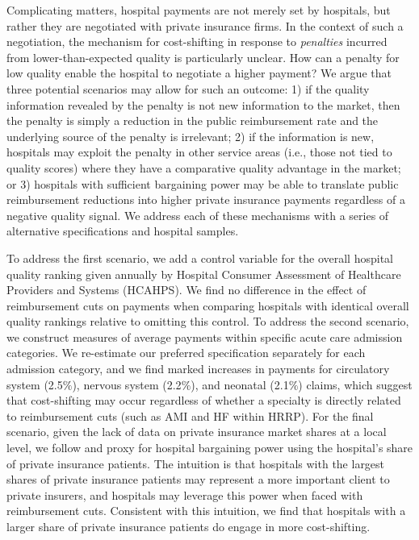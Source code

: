 \documentclass[12pt]{article}
\begin{document}
Complicating matters, hospital payments are not merely set by hospitals, but rather they are negotiated with private insurance firms. In the context of such a negotiation, the mechanism for cost-shifting in response to \textit{penalties} incurred from lower-than-expected quality is particularly unclear. How can a penalty for low quality enable the hospital to negotiate a higher payment? We argue that three potential scenarios may allow for such an outcome: 1) if the quality information revealed by the penalty is not new information to the market, then the penalty is simply a reduction in the public reimbursement rate and the underlying source of the penalty is irrelevant; 2) if the information is new, hospitals may exploit the penalty in other service areas (i.e., those not tied to quality scores) where they have a comparative quality advantage in the market; or 3) hospitals with sufficient bargaining power may be able to translate public reimbursement reductions into higher private insurance payments regardless of a negative quality signal. We address each of these mechanisms with a series of alternative specifications and hospital samples.

To address the first scenario, we add a control variable for the overall hospital quality ranking given annually by Hospital Consumer Assessment of Healthcare Providers and Systems (HCAHPS).  We find no difference in the effect of reimbursement cuts on payments when comparing hospitals with identical overall quality rankings relative to omitting this control.  To address the second scenario, we construct measures of average payments within specific acute care admission categories. We re-estimate our preferred specification separately for each admission category, and we find marked increases in payments for circulatory system (2.5$\%$), nervous system (2.2$\%$), and neonatal (2.1$\%$) claims, which suggest that cost-shifting may occur regardless of whether a specialty is directly related to reimbursement cuts (such as AMI and HF within HRRP).  For the final scenario, given the lack of data on private insurance market shares at a local level, we follow \cite{wu2010} and proxy for hospital bargaining power using the hospital's share of private insurance patients. The intuition is that hospitals with the largest shares of private insurance patients may represent a more important client to private insurers, and hospitals may leverage this power when faced with reimbursement cuts. Consistent with this intuition, we find that hospitals with a larger share of private insurance patients do engage in more cost-shifting.
\end{document}
